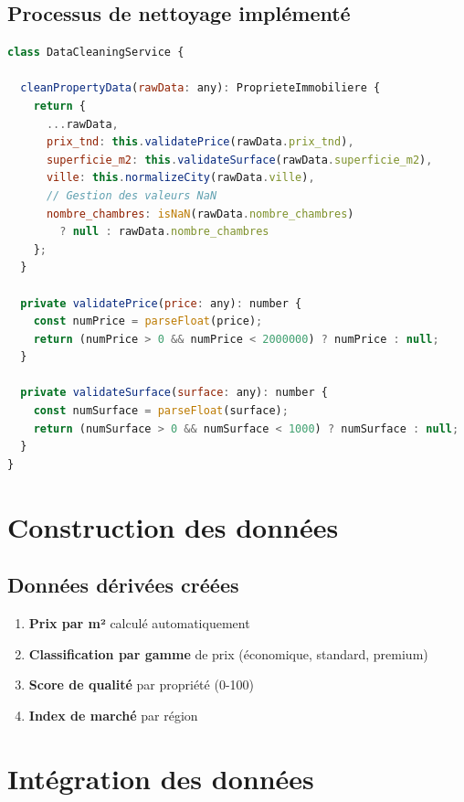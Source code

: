 \documentclass[12pt,a4paper]{report}
\begin{document}
\subsection{Processus de nettoyage implémenté}

\begin{lstlisting}[caption=Service de nettoyage des données TypeScript, language=javascript]
class DataCleaningService {
  
  cleanPropertyData(rawData: any): ProprieteImmobiliere {
    return {
      ...rawData,
      prix_tnd: this.validatePrice(rawData.prix_tnd),
      superficie_m2: this.validateSurface(rawData.superficie_m2),
      ville: this.normalizeCity(rawData.ville),
      // Gestion des valeurs NaN
      nombre_chambres: isNaN(rawData.nombre_chambres) 
        ? null : rawData.nombre_chambres
    };
  }
  
  private validatePrice(price: any): number {
    const numPrice = parseFloat(price);
    return (numPrice > 0 && numPrice < 2000000) ? numPrice : null;
  }
  
  private validateSurface(surface: any): number {
    const numSurface = parseFloat(surface);
    return (numSurface > 0 && numSurface < 1000) ? numSurface : null;
  }
}
\end{lstlisting}

\section{Construction des données}

\subsection{Données dérivées créées}

\begin{enumerate}
    \item \textbf{Prix par m²} calculé automatiquement
    \item \textbf{Classification par gamme} de prix (économique, standard, premium)
    \item \textbf{Score de qualité} par propriété (0-100)
    \item \textbf{Index de marché} par région
\end{enumerate}

\section{Intégration des données}
\end{document}
